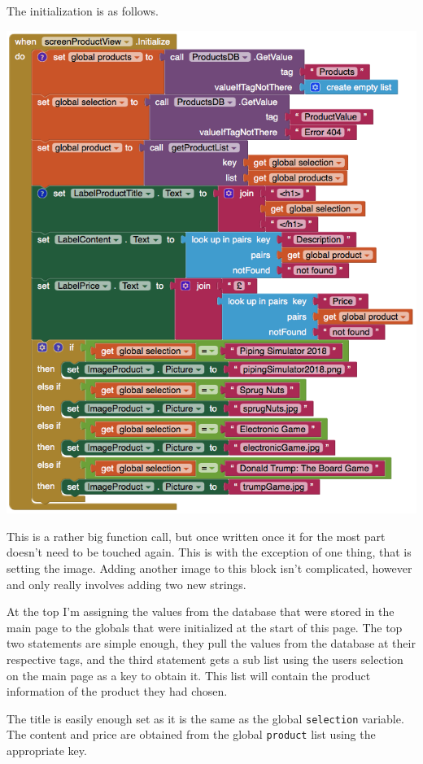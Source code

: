 \documentclass{scrreprt}
\begin{document}
The initialization is as follows.

\begin{center}
    \includegraphics[width=\linewidth]{images/productInit.png}
\end{center}

This is a rather big function call, but once written once it for the most part doesn't need to be touched again. This is with the exception of one thing, that is setting the image. Adding another image to this block isn't complicated, however and only really involves adding two new strings.

At the top I'm assigning the values from the database that were stored in the main page to the globals that were initialized at the start of this page. The top two statements are simple enough, they pull the values from the database at their respective tags, and the third statement gets a sub list using the users selection on the main page as a key to obtain it. This list will contain the product information of the product they had chosen.

The title is easily enough set as it is the same as the global \texttt{selection} variable. The content and price are obtained from the global \texttt{product} list using the appropriate key.
\end{document}

